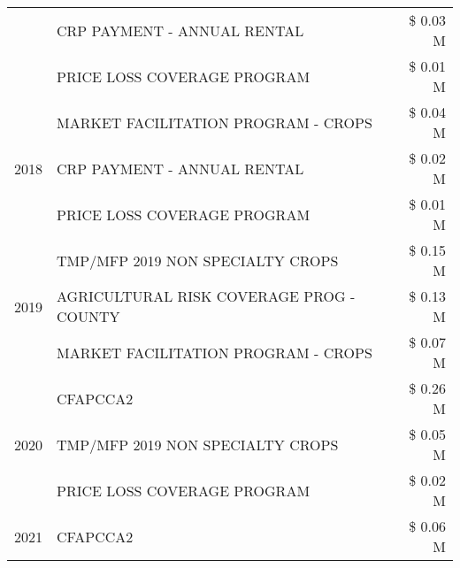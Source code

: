 \begin{tabular}{llr}
 & CRP PAYMENT - ANNUAL RENTAL & \$ 0.03 M \\
 & PRICE LOSS COVERAGE PROGRAM & \$ 0.01 M \\
\cline{1-3}
\multirow[t]{3}{*}{2018} & MARKET FACILITATION PROGRAM - CROPS & \$ 0.04 M \\
 & CRP PAYMENT - ANNUAL RENTAL & \$ 0.02 M \\
 & PRICE LOSS COVERAGE PROGRAM & \$ 0.01 M \\
\cline{1-3}
\multirow[t]{3}{*}{2019} & TMP/MFP 2019 NON SPECIALTY CROPS & \$ 0.15 M \\
 & AGRICULTURAL RISK COVERAGE PROG - COUNTY & \$ 0.13 M \\
 & MARKET FACILITATION PROGRAM - CROPS & \$ 0.07 M \\
\cline{1-3}
\multirow[t]{3}{*}{2020} & CFAPCCA2 & \$ 0.26 M \\
 & TMP/MFP 2019 NON SPECIALTY CROPS & \$ 0.05 M \\
 & PRICE LOSS COVERAGE PROGRAM & \$ 0.02 M \\
\cline{1-3}
2021 & CFAPCCA2 & \$ 0.06 M \\
\cline{1-3}
\bottomrule
\end{tabular}
